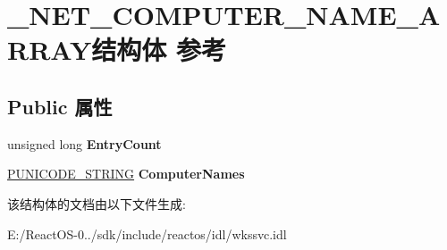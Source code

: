 \hypertarget{struct___n_e_t___c_o_m_p_u_t_e_r___n_a_m_e___a_r_r_a_y}{}\section{\+\_\+\+N\+E\+T\+\_\+\+C\+O\+M\+P\+U\+T\+E\+R\+\_\+\+N\+A\+M\+E\+\_\+\+A\+R\+R\+A\+Y结构体 参考}
\label{struct___n_e_t___c_o_m_p_u_t_e_r___n_a_m_e___a_r_r_a_y}
\subsection*{Public 属性}
\begin{DoxyCompactItemize}
\item 
\mbox{\label{struct___n_e_t___c_o_m_p_u_t_e_r___n_a_m_e___a_r_r_a_y_a470bbea5002b32186d957613be67ce4a}} 
unsigned long {\bfseries Entry\+Count}
\item 
\mbox{\label{struct___n_e_t___c_o_m_p_u_t_e_r___n_a_m_e___a_r_r_a_y_aa1c28d80afb6349880c8cc66e0445d16}} 
\hyperlink{struct___u_n_i_c_o_d_e___s_t_r_i_n_g}{P\+U\+N\+I\+C\+O\+D\+E\+\_\+\+S\+T\+R\+I\+NG} {\bfseries Computer\+Names}
\end{DoxyCompactItemize}


该结构体的文档由以下文件生成\+:\begin{DoxyCompactItemize}
\item 
E\+:/\+React\+O\+S-\/0../sdk/include/reactos/idl/wkssvc.\+idl\end{DoxyCompactItemize}
